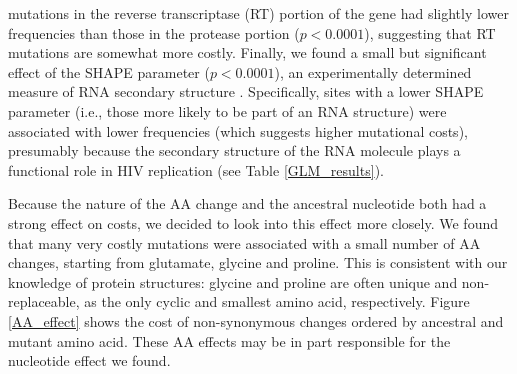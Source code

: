 \documentclass{article}
\begin{document}
mutations in the reverse transcriptase (RT) portion of the gene had slightly lower frequencies than those in the protease portion ($p < 0.0001$), suggesting that RT mutations are somewhat more costly. Finally, we found a small but significant effect of the SHAPE parameter ($p < 0.0001$), an experimentally determined measure of RNA secondary structure \cite{watts2009architecture}. Specifically, sites with a lower SHAPE parameter (i.e., those more likely to be part of an RNA structure) were associated with lower frequencies (which suggests higher mutational costs), presumably because the secondary structure of the RNA molecule plays a functional role in HIV replication \cite{watts2009architecture} (see Table \ref{GLM_results}). 

Because the nature of the AA change and the ancestral nucleotide
both had a strong effect on costs, we decided to look into this effect more closely. We found that many very costly mutations were associated with a small number of AA changes, starting from glutamate, glycine and proline. This is consistent with our knowledge of protein structures: glycine and proline are often unique and non-replaceable, as the only cyclic and smallest amino acid, respectively. Figure \ref{AA_effect} shows the cost of non-synonymous changes ordered by ancestral and mutant amino acid. These AA effects may be in part responsible for the nucleotide effect we found. %
\end{document}
